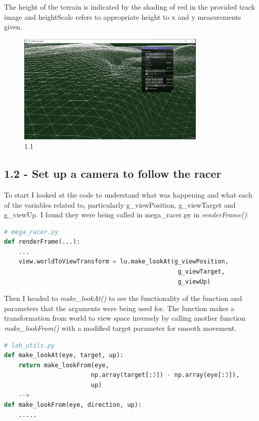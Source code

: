 \documentclass[a4 paper, 12pt]{article}
\begin{document}
The height of the terrain is indicated by the shading of red in the provided track image and heightScale refers to appropriate height to x and y measurements given. 
    \begin{figure} [H]
        \centering
        \includegraphics[width=0.8\textwidth, frame]
            {./images/1.1.PNG}
        \caption{1.1}
    \end{figure}  
   

\subsection{1.2 - Set up a camera to follow the racer}
To start I looked at the code to understand what was happening and what each of the variables related to, particularly g\_viewPosition, g\_viewTarget and g\_viewUp. I found they were being called in mega\_racer.py in \textit{renderFrame()}:
    \begin{lstlisting}[language=python]
# mega_racer.py 
def renderFrame(...):
    ...
    view.worldToViewTransform = lu.make_lookAt(g_viewPosition, 
                                                g_viewTarget, 
                                                g_viewUp)
    \end{lstlisting}

Then I headed to \textit{make\_lookAt()} to see the functionality of the function and parameters that the arguments were being used for. The function makes a transformation from world to view space inversely by calling another function \textit{make\_lookFrom()} with a modified target parameter for smooth movement.  
    \begin{lstlisting}[language=python]
# lab_utils.py
def make_lookAt(eye, target, up):
    return make_lookFrom(eye, 
                        np.array(target[:3]) - np.array(eye[:3]), 
                        up)
    --> 
def make_lookFrom(eye, direction, up):
    .....
    \end{lstlisting}
\end{document}
